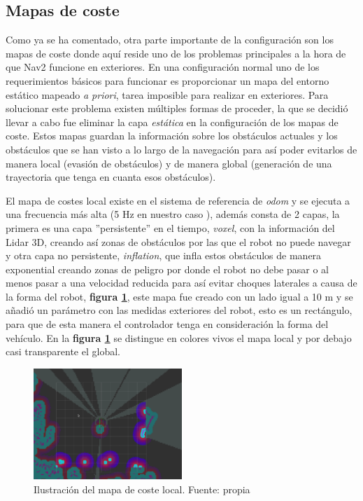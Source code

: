 \subsection{Mapas de coste}
Como ya se ha comentado, otra parte importante de la configuración son los mapas de coste donde aquí reside uno de los problemas principales 
a la hora de que Nav2 funcione en exteriores. En una configuración normal uno de los requerimientos básicos para funcionar es proporcionar 
un mapa del entorno estático mapeado \textit{a priori}, tarea imposible para realizar en exteriores. Para solucionar este problema existen múltiples formas 
de proceder, la que se decidió llevar a cabo fue eliminar la capa \textit{estática} en la configuración de los mapas de coste. Estos mapas guardan la 
información sobre los obstáculos actuales y los obstáculos que se han visto a lo largo de la navegación para así poder evitarlos de manera local (evasión de obstáculos) y 
de manera global (generación de una trayectoria que tenga en cuanta esos obstáculos).

El mapa de costes local existe en el sistema de referencia de \textit{odom} y se ejecuta 
a una frecuencia más alta (5 Hz en nuestro caso ), además consta de 2 capas, la primera es una capa ''persistente'' en el tiempo, \textit{voxel}, con la información del Lidar 3D, creando así zonas de obstáculos por 
las que el robot no puede navegar y otra capa no persistente, \textit{inflation}, que infla estos obstáculos de manera exponential creando zonas 
de peligro por donde el robot no debe pasar o al menos pasar a una velocidad reducida para así evitar choques laterales a causa de la forma del robot, \textbf{figura \ref{fig:mapa_local}}, este 
mapa fue creado con un lado igual a 10 m y se añadió un parámetro con las medidas exteriores del robot, esto es un rectángulo, para que de esta manera el controlador tenga en consideración 
la forma del vehículo. En la \textbf{figura \ref{fig:mapa_local}} se distingue en colores vivos el mapa local y por debajo casi transparente el global.

\begin{figure}[H]
    \centering
    \includegraphics[width=0.5\textwidth]{images/mapa_coste_local.png}
    \caption{Ilustración del mapa de coste local. Fuente: propia}
    \label{fig:mapa_local}
\end{figure}

